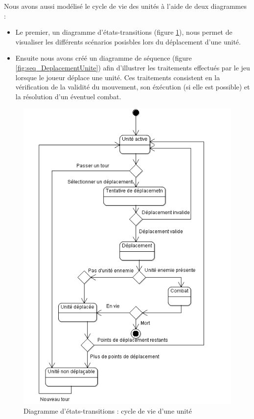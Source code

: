 Nous avons aussi modélisé le cycle de vie des unités à l'aide de deux diagrammes :
\begin{itemize}
  \item Le premier, un diagramme d'états-transitions (figure \ref{fig:CycleVieUnite}), nous permet de visualiser les différents scénarios posisbles lors du déplacement d'une unité.
  \item Ensuite nous avons créé un diagramme de séquence (figure \ref{fig:seq_DeplacementUnite}) afin d'illustrer les traitements effectués par le jeu lorsque le joueur déplace une unité. Ces traitements consistent en la vérification de la validité du mouvement, son éxécution (si elle est possible) et la résolution d'un éventuel combat.
\end{itemize}

\begin{figure}[!h]
\centering
\includegraphics[width=.7\textwidth]{Parties/Images/CycleVieUnite.png}
\caption{Diagramme d'états-transitions : cycle de vie d'une unité}
\label{fig:CycleVieUnite}
\end{figure}

